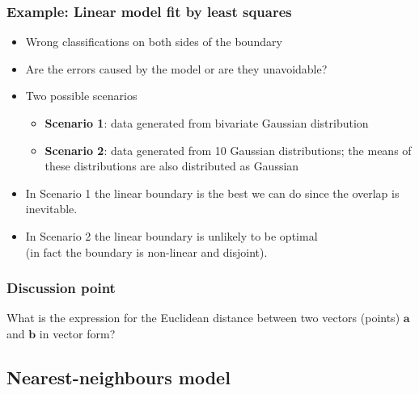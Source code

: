 \documentclass[notes]{beamer}          %
\newcommand{\vect}[1]{\bm{#1}}
\newcommand{\field}[1]{\mathbb{#1}}
\newcommand{\R}{\field{R}}
\newif\iffull
\begin{document}
\iffull
\begin{frame}
\frametitle{Example: Linear model fit by least squares}
\begin{itemize}
    \item Two classes separated in the plane ($\R^2$) by the decision boundary $\{ \vect{x} : \vect{w}^T\vect{x} = 0.5 \}$
    \item $\{ \vect{x} : \vect{w}^T\vect{x} < 0.5 \}$ set of \textcolor{blue}{BLUE} points
    \item $\{ \vect{x} : \vect{w}^T\vect{x} \geq 0.5 \}$ set of \textcolor{orange}{ORANGE} points

\end{itemize}
\end{frame}
\fi

\begin{frame}
\frametitle{Example: Linear model fit by least squares}
\begin{itemize}
    \item Wrong classifications on both sides of the boundary
    \item Are the errors caused by the model or are they unavoidable?
    \item Two possible scenarios
        \begin{itemize}
            \item {\bf Scenario 1}: data generated from bivariate Gaussian distribution
            \item {\bf Scenario 2}: data generated from 10 Gaussian distributions; the means of these distributions are also distributed as Gaussian
        \end{itemize}
    \item In Scenario 1 the linear boundary is the best we can do since the overlap is inevitable.
    \item In Scenario 2 the linear boundary is unlikely to be optimal \\
          (in fact the boundary is non-linear and disjoint).
\end{itemize}

\end{frame}

\begin{frame}
\frametitle{Discussion point}
What is the expression for the Euclidean distance between two vectors (points) $\mathbf{a}$ and $\mathbf{b}$ in vector form?

\end{frame}

\subsection{Nearest-neighbours model}
\end{document}
